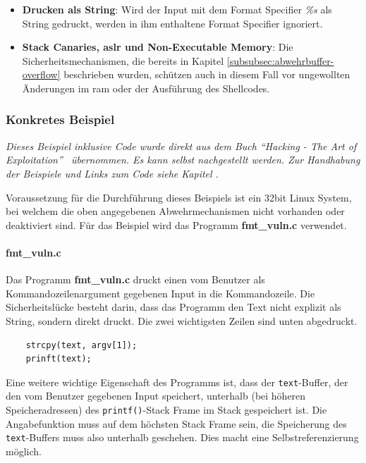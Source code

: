 \documentclass[11pt, a4paper]{article}
\begin{document}
\begin{itemize}
	\item \textbf{Drucken als String}: Wird der Input mit dem Format Specifier \textit{\%s} als String gedruckt, werden in ihm enthaltene Format Specifier ignoriert. 
	\item \textbf{Stack Canaries, \gls{aslr} und Non-Executable Memory}: Die Sicherheitsmechanismen, die bereits in Kapitel \ref{subsubsec:abwehrbuffer-overflow} beschrieben wurden, schützen auch in diesem Fall vor ungewollten Änderungen im \gls{ram} oder der Ausführung des Shellcodes.
\end{itemize} 

\subsubsection{Konkretes Beispiel}\label{subsubsec:bspprintf}
\textit{Dieses Beispiel inklusive Code wurde direkt aus dem Buch ``Hacking - The Art of Exploitation''~\cite{erickson2008hacking} übernommen. Es kann selbst nachgestellt werden. Zur Handhabung der Beispiele und Links zum Code siehe Kapitel .}

Voraussetzung für die Durchführung dieses Beispiels ist ein 32bit Linux System, bei welchem die oben angegebenen Abwehrmechanismen nicht vorhanden oder deaktiviert sind. Für das Beispiel wird das Programm \textbf{fmt\_vuln.c} verwendet. 

\paragraph{fmt\_vuln.c}
Das Programm \textbf{fmt\_vuln.c} druckt einen vom Benutzer als Kommandozeilenargument gegebenen Input in die Kommandozeile. Die Sicherheitslücke besteht darin, dass das Programm den Text nicht explizit als String, sondern direkt druckt. Die zwei wichtigsten Zeilen sind unten abgedruckt.

\begin{lstlisting}
	strcpy(text, argv[1]);
	prinft(text);
\end{lstlisting} 
Eine weitere wichtige Eigenschaft des Programms ist, dass der \texttt{text}-Buffer, der den vom Benutzer gegebenen Input speichert, unterhalb (bei höheren Speicheradressen) des \texttt{printf()}-Stack Frame im Stack gespeichert ist. Die Angabefunktion muss auf dem höchsten Stack Frame sein, die Speicherung des \texttt{text}-Buffers muss also unterhalb geschehen. Dies macht eine Selbstreferenzierung möglich.
\end{document}
